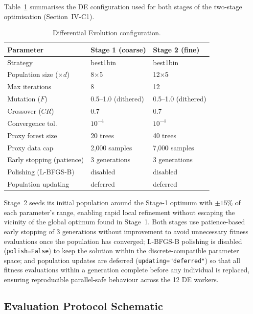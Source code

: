 \documentclass[journal]{IEEEtran}
\begin{document}
	Table~\ref{tab:de_config_supp} summarises the DE configuration used for both stages of the two-stage optimisation (Section~IV-C1).
	
	\begin{table}[h]
		\centering
		\caption{Differential Evolution configuration.}
		\label{tab:de_config_supp}
		\begin{tabular}{lll}
			\toprule
			\textbf{Parameter} & \textbf{Stage 1 (coarse)} & \textbf{Stage 2 (fine)} \\
			\midrule
			Strategy & best1bin & best1bin \\
			Population size ($\times d$) & 8$\times$5 & 12$\times$5 \\
			Max iterations & 8 & 12 \\
			Mutation ($F$) & 0.5--1.0 (dithered) & 0.5--1.0 (dithered) \\
			Crossover ($CR$) & 0.7 & 0.7 \\
			Convergence tol. & $10^{-4}$ & $10^{-4}$ \\
			Proxy forest size & 20 trees & 40 trees \\
			Proxy data cap & 2{,}000 samples & 7{,}000 samples \\
			Early stopping (patience) & 3 generations & 3 generations \\
			Polishing (L-BFGS-B) & disabled & disabled \\
			Population updating & deferred & deferred \\
			\bottomrule
		\end{tabular}
	\end{table}
	
	Stage~2 seeds its initial population around the Stage-1 optimum with $\pm15\%$ of each parameter's range, enabling rapid local refinement without escaping the vicinity of the global optimum found in Stage~1. Both stages use patience-based early stopping of 3 generations without improvement to avoid unnecessary fitness evaluations once the population has converged; L-BFGS-B polishing is disabled (\texttt{polish=False}) to keep the solution within the discrete-compatible parameter space; and population updates are deferred (\texttt{updating="deferred"}) so that all fitness evaluations within a generation complete before any individual is replaced, ensuring reproducible parallel-safe behaviour across the 12 DE workers.
	
	\subsection{Evaluation Protocol Schematic}
	
\end{document}
